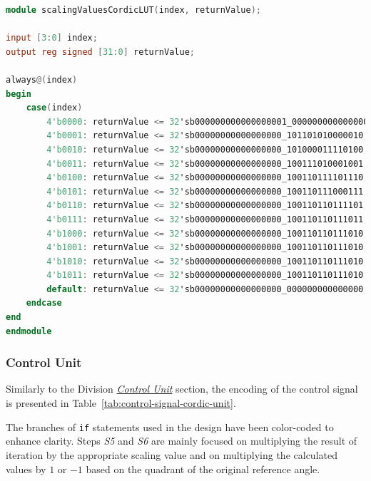\documentclass[a4paper, twoside, 11pt]{article}
\newcommand{\fbar}{\FloatBarrier}
\begin{document}
            \begin{lstlisting}[language={verilog}, caption={Verilog code of the scalingValuesCordicLUT lookup table (\gls{abbreviation:lut}) implementation.}, label= {lst:scalingValuesCordicLUT}]
module scalingValuesCordicLUT(index, returnValue);

input [3:0] index;
output reg signed [31:0] returnValue;

always@(index)
begin
    case(index)
        4'b0000: returnValue <= 32'sb000000000000000001_000000000000000; // 1
        4'b0001: returnValue <= 32'sb00000000000000000_101101010000010; // 0.7071067811865476
        4'b0010: returnValue <= 32'sb00000000000000000_101000011110100; // 0.6324555320336759
        4'b0011: returnValue <= 32'sb00000000000000000_100111010001001; // 0.6135719910778964
        4'b0100: returnValue <= 32'sb00000000000000000_100110111101110; // 0.6088339125177524
        4'b0101: returnValue <= 32'sb00000000000000000_100110111000111; // 0.6088339125177524
        4'b0110: returnValue <= 32'sb00000000000000000_100110110111101; // 0.607351770141296
        4'b0111: returnValue <= 32'sb00000000000000000_100110110111011; // 0.6072776440935261
        4'b1000: returnValue <= 32'sb00000000000000000_100110110111010; // 0.6072591122988928
        4'b1001: returnValue <= 32'sb00000000000000000_100110110111010; // 0.6072544793325625
        4'b1010: returnValue <= 32'sb00000000000000000_100110110111010; // 0.6072533210898753
        4'b1011: returnValue <= 32'sb00000000000000000_100110110111010; // 0.6072530315291345
        default: returnValue <= 32'sb00000000000000000_000000000000000; // 0
    endcase
end
endmodule\end{lstlisting}
        \fbar
        \subsubsection{Control Unit}\label{subsubsec:cordic-control-unit}
        Similarly to the Division \hyperref[subsubsec:division-control-unit]{\textit{Control Unit}} section, the encoding of the control signal is presented in Table~\ref{tab:control-signal-cordic-unit}.\par
        The branches of \texttt{if} statements used in the design have been color-coded to enhance clarity. Steps \textit{S5} and \textit{S6} are mainly focused on multiplying the result of iteration by the appropriate scaling value and on multiplying the calculated values by $1$ or $-1$ based on the quadrant of the original reference angle.
        
\end{document}
